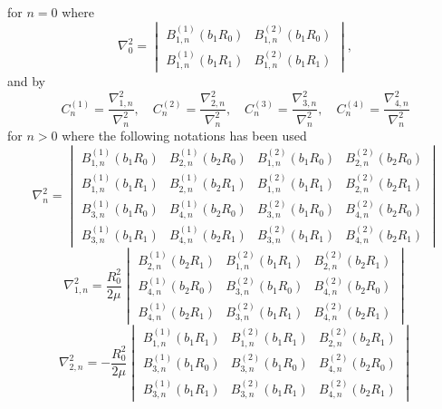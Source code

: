 for $n=0$ where
\begin{equation*}
	\nabla^2_0=\begin{vmatrix}
		B_{1,n}^{(1)}(b_1 R_0) & B_{1,n}^{(2)}(b_1 R_0)\\
		B_{1,n}^{(1)}(b_1 R_1) & B_{1,n}^{(2)}(b_1 R_1)
	\end{vmatrix},
\end{equation*}
and by
\begin{equation*}
	C_n^{(1)} = \frac{\nabla^2_{1,n}}{\nabla^2_n},\quad C_n^{(2)} = \frac{\nabla^2_{2,n}}{\nabla^2_n},\quad C_n^{(3)} = \frac{\nabla^2_{3,n}}{\nabla^2_n},\quad C_n^{(4)} = \frac{\nabla^2_{4,n}}{\nabla^2_n}
\end{equation*}
for $n>0$ where the following notations has been used
\begin{equation*}
	\nabla^2_n = \begin{vmatrix}
		B_{1,n}^{(1)}(b_1 R_0) & B_{2,n}^{(1)}(b_2 R_0) & B_{1,n}^{(2)}(b_1 R_0) & B_{2,n}^{(2)}(b_2 R_0)\\
		B_{1,n}^{(1)}(b_1 R_1) & B_{2,n}^{(1)}(b_2 R_1) & B_{1,n}^{(2)}(b_1 R_1) & B_{2,n}^{(2)}(b_2 R_1)\\
		B_{3,n}^{(1)}(b_1 R_0) & B_{4,n}^{(1)}(b_2 R_0) & B_{3,n}^{(2)}(b_1 R_0) & B_{4,n}^{(2)}(b_2 R_0)\\
		B_{3,n}^{(1)}(b_1 R_1) & B_{4,n}^{(1)}(b_2 R_1) & B_{3,n}^{(2)}(b_1 R_1) & B_{4,n}^{(2)}(b_2 R_1)
	\end{vmatrix}
\end{equation*}
\begin{equation*}
	\nabla^2_{1,n} = \frac{R_0^2}{2\mu}\begin{vmatrix}
		B_{2,n}^{(1)}(b_2 R_1) & B_{1,n}^{(2)}(b_1 R_1) & B_{2,n}^{(2)}(b_2 R_1)\\
		B_{4,n}^{(1)}(b_2 R_0) & B_{3,n}^{(2)}(b_1 R_0) & B_{4,n}^{(2)}(b_2 R_0)\\
		B_{4,n}^{(1)}(b_2 R_1) & B_{3,n}^{(2)}(b_1 R_1) & B_{4,n}^{(2)}(b_2 R_1)
	\end{vmatrix}
\end{equation*}
\begin{equation*}
	\nabla^2_{2,n} = -\frac{R_0^2}{2\mu}\begin{vmatrix}
		B_{1,n}^{(1)}(b_1 R_1) & B_{1,n}^{(2)}(b_1 R_1) & B_{2,n}^{(2)}(b_2 R_1)\\
		B_{3,n}^{(1)}(b_1 R_0) & B_{3,n}^{(2)}(b_1 R_0) & B_{4,n}^{(2)}(b_2 R_0)\\
		B_{3,n}^{(1)}(b_1 R_1) & B_{3,n}^{(2)}(b_1 R_1) & B_{4,n}^{(2)}(b_2 R_1)
	\end{vmatrix}
\end{equation*}
